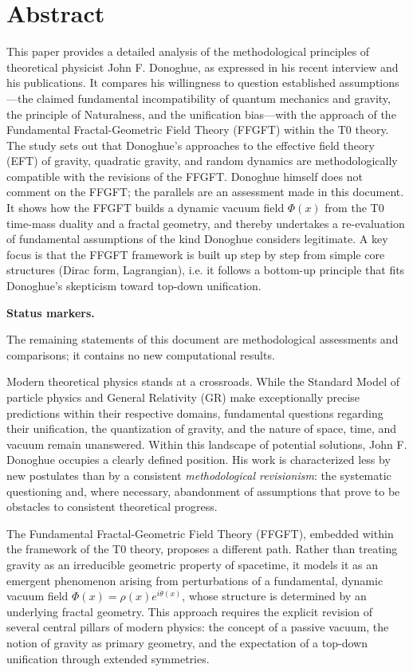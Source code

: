 	
\section*{Abstract}
		This paper provides a detailed analysis of the methodological principles of theoretical physicist John F. Donoghue, as expressed in his recent interview \cite{DonoghueInterview2025} and his publications. It compares his willingness to question established assumptions—the claimed fundamental incompatibility of quantum mechanics and gravity, the principle of Naturalness, and the unification bias—with the approach of the Fundamental Fractal-Geometric Field Theory (FFGFT) within the T0 theory. The study sets out that Donoghue's approaches to the effective field theory (EFT) of gravity, quadratic gravity, and random dynamics are methodologically compatible with the revisions of the FFGFT. Donoghue himself does not comment on the FFGFT; the parallels are an assessment made in this document. It shows how the FFGFT builds a dynamic vacuum field $\Phi(x)$ from the T0 time-mass duality and a fractal geometry, and thereby undertakes a re-evaluation of fundamental assumptions of the kind Donoghue considers legitimate. A key focus is that the FFGFT framework is built up step by step from simple core structures (Dirac form, Lagrangian), i.e. it follows a bottom-up principle that fits Donoghue's skepticism toward top-down unification.

		\medskip\noindent\textbf{Status markers.}
		

		\noindent The remaining statements of this document are methodological assessments and comparisons; it contains no new computational results.

	
	
	
	Modern theoretical physics stands at a crossroads. While the Standard Model of particle physics and General Relativity (GR) make exceptionally precise predictions within their respective domains, fundamental questions regarding their unification, the quantization of gravity, and the nature of space, time, and vacuum remain unanswered. Within this landscape of potential solutions, John F. Donoghue occupies a clearly defined position. His work is characterized less by new postulates than by a consistent \emph{methodological revisionism}: the systematic questioning and, where necessary, abandonment of assumptions that prove to be obstacles to consistent theoretical progress.
	
	The Fundamental Fractal-Geometric Field Theory (FFGFT), embedded within the framework of the T0 theory, proposes a different path. Rather than treating gravity as an irreducible geometric property of spacetime, it models it as an emergent phenomenon arising from perturbations of a fundamental, dynamic vacuum field $\Phi(x) = \rho(x) e^{i\theta(x)}$, whose structure is determined by an underlying fractal geometry. This approach requires the explicit revision of several central pillars of modern physics: the concept of a passive vacuum, the notion of gravity as primary geometry, and the expectation of a top-down unification through extended symmetries.
	
